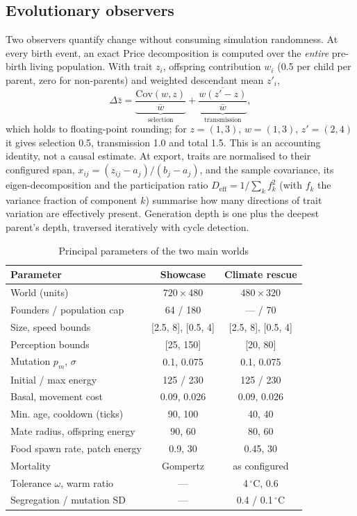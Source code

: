 \documentclass[conference]{IEEEtran}
\begin{document}
\subsection{Evolutionary observers}
Two observers quantify change without consuming simulation randomness. At every
birth event, an exact Price decomposition \cite{price1970,frank2012} is computed
over the \emph{entire} pre-birth living population. With trait $z_i$, offspring
contribution $w_i$ (0.5 per child per parent, zero for non-parents) and weighted
descendant mean $z'_i$,
\begin{equation}
\Delta\bar z=\underbrace{\frac{\mathrm{Cov}(w,z)}{\bar w}}_{\text{selection}}
+\underbrace{\frac{\overline{w(z'-z)}}{\bar w}}_{\text{transmission}},
\end{equation}
which holds to floating-point rounding; for $z=(1,3)$, $w=(1,3)$, $z'=(2,4)$ it
gives selection 0.5, transmission 1.0 and total 1.5. This is an accounting
identity, not a causal estimate. At export, traits are normalised to their
configured span, $x_{ij}=(z_{ij}-a_j)/(b_j-a_j)$, and the sample covariance, its
eigen-decomposition and the participation ratio
$D_{\text{eff}}=1/\sum_k f_k^2$ (with $f_k$ the variance fraction of component
$k$) summarise how many directions of trait variation are effectively present.
Generation depth is one plus the deepest parent's depth, traversed iteratively
with cycle detection.

\begin{table}[t]
\caption{Principal parameters of the two main worlds}
\label{tab:params}
\centering
\setlength{\tabcolsep}{3pt}
\begin{tabular}{lcc}
\toprule
Parameter & Showcase & Climate rescue\\
\midrule
World (units) & $720\times480$ & $480\times320$\\
Founders / population cap & 64 / 180 & --- / 70\\
Size, speed bounds & [2.5, 8], [0.5, 4] & [2.5, 8], [0.5, 4]\\
Perception bounds & [25, 150] & [20, 80]\\
Mutation $p_m$, $\sigma$ & 0.1, 0.075 & 0.1, 0.075\\
Initial / max energy & 125 / 230 & 125 / 230\\
Basal, movement cost & 0.09, 0.026 & 0.09, 0.026\\
Min. age, cooldown (ticks) & 90, 100 & 40, 40\\
Mate radius, offspring energy & 90, 60 & 80, 60\\
Food spawn rate, patch energy & 0.9, 30 & 0.45, 30\\
Mortality & Gompertz & as configured\\
Tolerance $\omega$, warm ratio & --- & 4\,$^{\circ}$C, 0.6\\
Segregation / mutation SD & --- & 0.4 / 0.1\,$^{\circ}$C\\
\bottomrule
\end{tabular}
\end{table}
\end{document}
